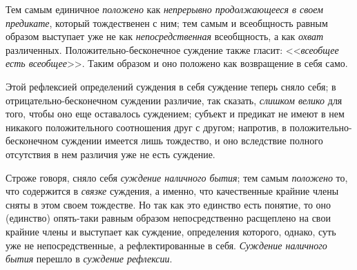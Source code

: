 {Тем самым единичное
{\em положено} как
{\em непрерывно продолжающееся в своем
предикате}, который тождественен с ним; тем самым и
всеобщность равным образом выступает уже не как
{\em непосредственная}
всеобщность, а как
{\em охват} различенных.
Положительно-бесконечное суждение также гласит:
<<{\em всеобщее есть всеобщее}>>.
Таким образом и оно положено как возвращение в себя само.

Этой рефлексией определений суждения в себя суждение теперь
сняло себя; в отрицательно-бесконечном суждении различие, так сказать,
{\em слишком велико} для
того, чтобы оно еще оставалось суждением; субъект и предикат не имеют в нем
никакого положительного соотношения друг с другом; напротив, в
положительно-бесконечном суждении имеется лишь тождество, и оно вследствие
полного отсутствия в нем различия уже не есть суждение.

Строже говоря, сняло себя
{\em суждение наличного бытия};
тем самым {\em положено}
то, что содержится в
{\em связке} суждения, а
именно, что качественные крайние члены сняты в этом своем тождестве. Но так
как это единство есть понятие, то оно (единство) опять-таки равным образом
непосредственно расщеплено на свои крайние члены и выступает как суждение,
определения которого, однако, суть уже не непосредственные, а
рефлектированные в себя. {\em Суждение
наличного бытия} перешло в
{\em суждение рефлексии}.

}
